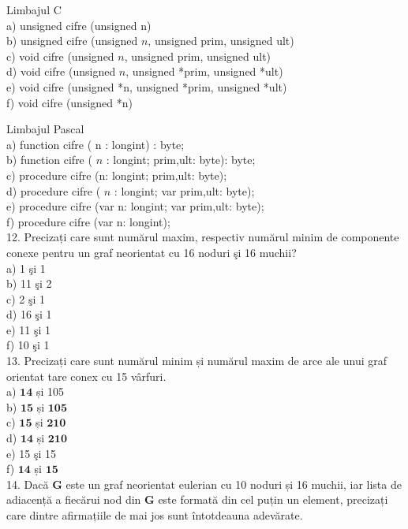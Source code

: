 \documentclass[10pt]{article}
\begin{document}
Limbajul C\\
a) unsigned cifre (unsigned n)\\
b) unsigned cifre (unsigned $n$, unsigned prim, unsigned ult)\\
c) void cifre (unsigned $n$, unsigned prim, unsigned ult)\\
d) void cifre (unsigned $n$, unsigned *prim, unsigned *ult)\\
e) void cifre (unsigned *n, unsigned *prim, unsigned *ult)\\
f) void cifre (unsigned *n)

Limbajul Pascal\\
a) function cifre ( n : longint) : byte;\\
b) function cifre ( $n$ : longint; prim,ult: byte): byte;\\
c) procedure cifre (n: longint; prim,ult: byte);\\
d) procedure cifre ( $n$ : longint; var prim,ult: byte);\\
e) procedure cifre (var n: longint; var prim,ult: byte);\\
f) procedure cifre (var n: longint);\\
12. Precizați care sunt numărul maxim, respectiv numărul minim de componente conexe pentru un graf neorientat cu 16 noduri şi 16 muchii?\\
a) 1 şi 1\\
b) 11 şi 2\\
c) 2 şi 1\\
d) 16 şi 1\\
e) 11 şi 1\\
f) 10 şi 1\\
13. Precizați care sunt numărul minim și numărul maxim de arce ale unui graf orientat tare conex cu 15 vârfuri.\\
a) $\mathbf{1 4}$ și 105\\
b) $\mathbf{1 5}$ și $\mathbf{1 0 5}$\\
c) $\mathbf{1 5}$ și $\mathbf{2 1 0}$\\
d) $\mathbf{1 4}$ și $\mathbf{2 1 0}$\\
e) 15 şi 15\\
f) $\mathbf{1 4}$ și $\mathbf{1 5}$\\
14. Dacă $\mathbf{G}$ este un graf neorientat eulerian cu 10 noduri și 16 muchii, iar lista de adiacență a fiecărui nod din $\mathbf{G}$ este formată din cel puțin un element, precizați care dintre afirmațiile de mai jos sunt întotdeauna adevărate.
\end{document}
